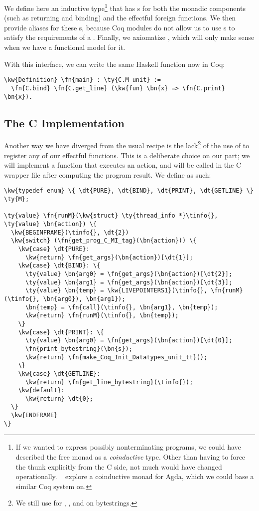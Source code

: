 We define here an \gls{inductive type}\footnote{If we wanted to express possibly nonterminating programs, we could have described the free monad as a \emph{coinductive} type. Other than having to force the thunk explicitly from the C side, not much would have changed operationally. \citeauthor{abel2017interactive}~\cite{abel2017interactive} explore a coinductive  monad for Agda, which we could base a similar Coq system on.} that has \constructor{}s for both the monadic components (such as returning and binding) and the effectful \gls{foreign function}s. We then provide aliases for these \constructor{}s, because Coq modules do not allow us to use \constructor{}s to satisfy the requirements of a . Finally, we axiomatize , which will only make sense when we have a \gls{functional model} for it.

With this interface, we can write the same Haskell function now in Coq:

\begin{Verbatim}
\kw{Definition} \fn{main} : \ty{C.M unit} :=
  \fn{C.bind} \fn{C.get_line} (\kw{fun} \bn{x} => \fn{C.print} \bn{x}).
\end{Verbatim}

\subsection{The C Implementation}
\label{printingbytestringsc}

Another way we have diverged from the usual recipe is the lack\footnote{We still use  for , , and  on bytestrings.} of the use of  to register any of our effectful functions. This is a deliberate choice on our part; we will implement a function  that executes an action, and  will be called in the C wrapper file after computing the program result. We define  as such:

\begin{Verbatim}
\kw{typedef enum} \{ \dt{PURE}, \dt{BIND}, \dt{PRINT}, \dt{GETLINE} \} \ty{M};

\ty{value} \fn{runM}(\kw{struct} \ty{thread_info *}\tinfo{}, \ty{value} \bn{action}) \{
  \kw{BEGINFRAME}(\tinfo{}, \dt{2})
  \kw{switch} (\fn{get_prog_C_MI_tag}(\bn{action})) \{
    \kw{case} \dt{PURE}:
      \kw{return} \fn{get_args}(\bn{action})[\dt{1}];
    \kw{case} \dt{BIND}: \{
      \ty{value} \bn{arg0} = \fn{get_args}(\bn{action})[\dt{2}];
      \ty{value} \bn{arg1} = \fn{get_args}(\bn{action})[\dt{3}];
      \ty{value} \bn{temp} = \kw{LIVEPOINTERS1}(\tinfo{}, \fn{runM}(\tinfo{}, \bn{arg0}), \bn{arg1});
      \bn{temp} = \fn{call}(\tinfo{}, \bn{arg1}, \bn{temp});
      \kw{return} \fn{runM}(\tinfo{}, \bn{temp});
    \}
    \kw{case} \dt{PRINT}: \{
      \ty{value} \bn{arg0} = \fn{get_args}(\bn{action})[\dt{0}];
      \fn{print_bytestring}(\bn{s});
      \kw{return} \fn{make_Coq_Init_Datatypes_unit_tt}();
    \}
    \kw{case} \dt{GETLINE}:
      \kw{return} \fn{get_line_bytestring}(\tinfo{});
    \kw{default}:
      \kw{return} \dt{0};
  \}
  \kw{ENDFRAME}
\}
\end{Verbatim}

